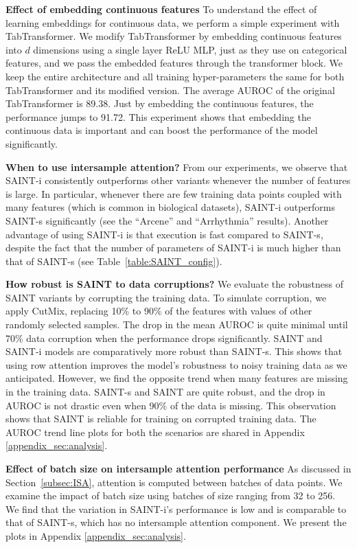 \textbf{Effect of embedding continuous features} To understand the effect of learning embeddings for continuous data, we perform a simple experiment with TabTransformer. We modify TabTransformer by embedding continuous features into $d$ dimensions using a single layer ReLU MLP, just as they use on categorical features, and we pass the embedded features through the transformer block. We keep the entire architecture and all training hyper-parameters the same for both TabTransformer and its modified version. The average AUROC of the original TabTransformer is 89.38. Just by embedding the continuous features, the performance jumps to 91.72. This experiment shows that embedding the continuous data is important and can boost the performance of the model significantly. 

\textbf{When to use intersample attention?} From our experiments, we observe that SAINT-i consistently outperforms other variants whenever the number of features is large. In particular, whenever there are few training data points coupled with many features (which is common in biological datasets), SAINT-i outperforms SAINT-s significantly (see the ``Arcene'' and ``Arrhythmia'' results). Another advantage of using SAINT-i is that execution is fast compared to SAINT-s,  despite the fact that the number of parameters of SAINT-i is much higher than that of SAINT-s (see Table~\ref{table:SAINT_config}). 

\textbf{How robust is SAINT to data corruptions?} We evaluate the robustness of SAINT variants by corrupting the training data.  To simulate corruption, we apply CutMix, replacing 10\% to 90\% of the features with values of other randomly selected samples. The drop in the mean AUROC is quite minimal until 70\% data corruption when the performance drops significantly. SAINT and SAINT-i models are comparatively more robust than SAINT-s. This shows that using row attention improves the model's robustness to noisy training data as we anticipated. However, we find the opposite trend when many features are missing in the training data. SAINT-s and SAINT are quite robust, and the drop in AUROC is not drastic even when 90\% of the data is missing. This observation shows that SAINT is reliable for training on corrupted training data. The AUROC trend line plots for both the scenarios are shared in Appendix \ref{appendix_sec:analysis}.

\textbf{Effect of batch size on intersample attention performance} As discussed in Section~\ref{subsec:ISA}, attention is computed between batches of data points. We examine the impact of batch size using batches of size ranging from 32 to 256. We find that the variation in SAINT-i's performance is low and is comparable to that of SAINT-s, which has no intersample attention component. We present the plots in Appendix \ref{appendix_sec:analysis}.

